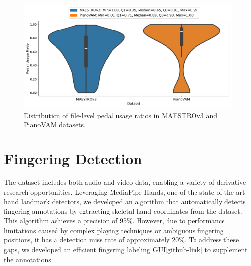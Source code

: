 \documentclass{article}
\begin{document}
\begin{figure}
    \centering
    \includegraphics[width=\linewidth]{Images/pedal_comparison.pdf}\hspace*{0cm}
    \caption{Distribution of file-level pedal usage ratios in MAESTROv3 and PianoVAM datasets.}
    \label{fig:Pedal-Comparison}
\end{figure}




\section{Fingering Detection}\label{sec:fingering_detection}

The dataset includes both audio and video data, enabling a variety of derivative research opportunities. Leveraging MediaPipe Hands\cite{arXiv20Zhang}, one of the state-of-the-art hand landmark detectors, we developed an algorithm that automatically detects fingering annotations by extracting skeletal hand coordinates from the dataset. This algorithm achieves a precision of 95\%. However, due to performance limitations caused by complex playing techniques or ambiguous fingering positions, it has a detection miss rate of approximately 20\%. To address these gaps, we developed an efficient fingering labeling GUI\cref{github-link} to supplement the annotations.

\end{document}
